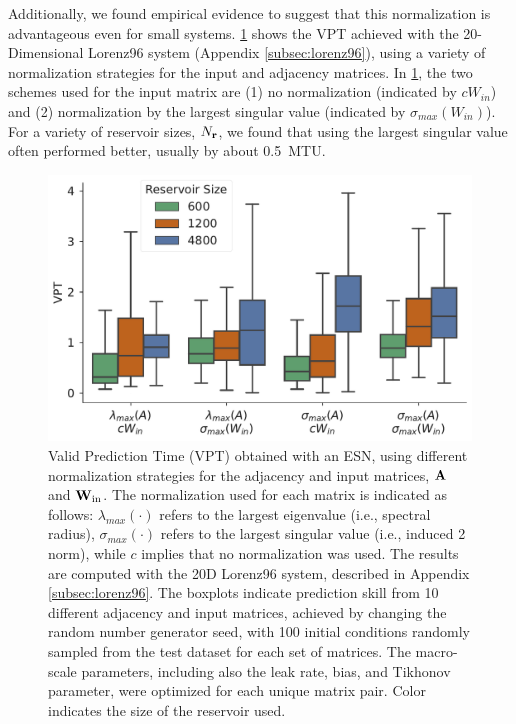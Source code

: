\documentclass[draft]{agujournal2019}
\begin{document}
Additionally, we found empirical evidence to suggest that this normalization is
advantageous even for small systems.
\cref{fig:simple-normalization} shows the VPT achieved with
the 20-Dimensional Lorenz96 system (Appendix \cref{subsec:lorenz96}), using a variety of
normalization strategies for the input and adjacency matrices.
In \cref{fig:simple-normalization}, the two schemes used for the input matrix
are (1) no normalization (indicated by $c W_{in}$) and
(2) normalization by the largest singular value (indicated by
$\sigma_{max}(W_{in})$).
For a variety of reservoir sizes, $N_{\mathbf{r}}$, we found that using the largest
singular value often performed better, usually by about 0.5~MTU.

\begin{figure}
    \centering
    \includegraphics[width=.8\textwidth]{figures/matrix_normalization.pdf}
    \caption{Valid Prediction Time (VPT) obtained with an ESN, using
        different normalization strategies for the adjacency and input matrices,
        $\mathbf{A}$ and $\mathbf{W}_\text{in}$. The normalization used for each matrix
        is indicated as follows:
        $\lambda_{max}(\cdot)$ refers to the largest eigenvalue (i.e.,
        spectral radius),
        $\sigma_{max}(\cdot)$ refers to the largest singular value (i.e.,
        induced 2 norm),
        while $c$ implies that no normalization was used.
        The results are computed with the 20D Lorenz96 system, described in
        Appendix \cref{subsec:lorenz96}.
        The boxplots indicate prediction skill from 10 different adjacency and
        input matrices, achieved by changing the random number generator seed,
        with 100 initial conditions randomly sampled from the test dataset for
        each set of matrices.
        The macro-scale parameters, including also the leak rate, bias, and
        Tikhonov parameter, were optimized for each unique matrix pair.
        Color indicates the size of the reservoir used.
    }
    \label{fig:simple-normalization}
\end{figure}
\end{document}

